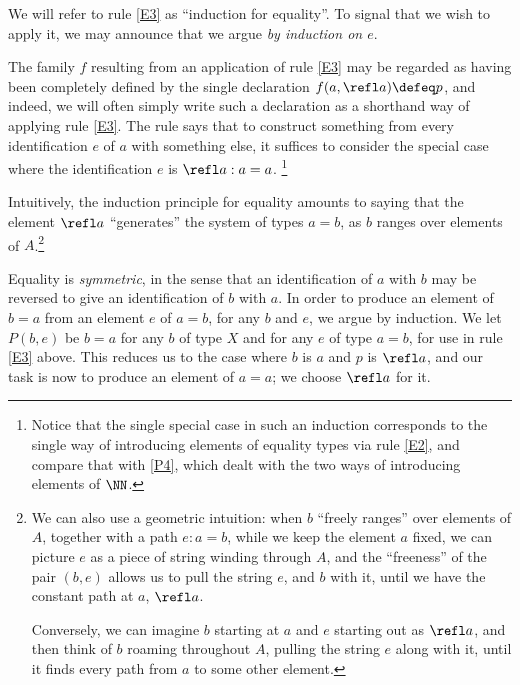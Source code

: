 We will refer to rule \ref{E3} as ``induction for equality''.  To signal that we wish to apply it, we may announce that we argue \emph{by induction on $e$}.

The family $f$ resulting from an application of rule \ref{E3} may be regarded as having been completely defined by the single declaration
$f(a,\refl a) \defeq p$,
and indeed, we will often simply write such a declaration as a shorthand way of applying rule \ref{E3}.
The rule says that to construct something from every identification $e$ of $a$ with something else,
it suffices to consider the special case where the identification $e$ is $\refl a : a=a$.%
\footnote{Notice that the single special case in such an induction corresponds to the single way of introducing elements of
equality types via rule \ref{E2}, and compare that with \ref{P4}, which dealt with the two ways of introducing elements of $\NN$.}

Intuitively, the induction principle for equality amounts to saying that the element $\refl a$ ``generates'' the system of types $a=b$, as $b$
ranges over elements of $A$.\footnote{%
  We can also use a geometric intuition: when $b$ ``freely ranges'' over elements of $A$,
  together with a path $e : a=b$,
  while we keep the element $a$ fixed, we can picture $e$ as a piece of string
  winding through $A$, and the ``freeness'' of the pair $(b,e)$ allows us to pull the string $e$,
  and $b$ with it, until we have the constant path at $a$, $\refl a$.\par
  Conversely, we can imagine $b$ starting at $a$ and $e$ starting out as $\refl a$, and then think of $b$ roaming throughout $A$, pulling
  the string $e$ along with it, until it finds every path from $a$ to some other element.
}

Equality is \emph{symmetric}, in the sense that an identification of $a$ with $b$ may be reversed to give an identification of $b$ with $a$.  In
order to produce an element of $b=a$ from an element $e$ of $a=b$, for any $b$ and $e$, we argue by induction.  We let $P(b,e)$ be $b=a$ for any
$b$ of type $X$ and for any $e$ of type $a=b$, for use in rule \ref{E3} above.
This reduces us to the case where $b$ is $a$ and $p$ is $\refl a$, and
our task is now to produce an element of $a=a$; we choose $\refl a$ for it.

